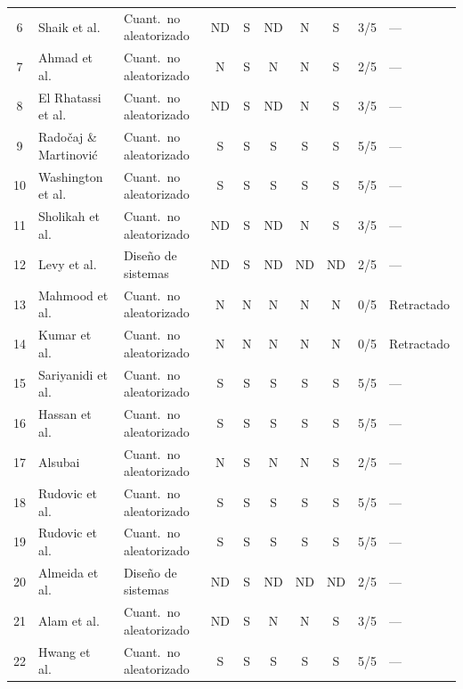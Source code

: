 \documentclass[3p,twocolumn,times]{elsarticle}
\begin{document}
\begin{longtable}{clp{3cm}ccccccl}
		6  & Shaik et al.\ \cite{Shaik2025}               & Cuant.\ no aleatorizado & ND & S  & ND & N  & S  & 3/5 & --- \\
		7  & Ahmad et al.\ \cite{Ahmad2024}               & Cuant.\ no aleatorizado & N  & S  & N  & N  & S  & 2/5 & --- \\
		8  & El Rhatassi et al.\ \cite{Rhatassi2024}      & Cuant.\ no aleatorizado & ND & S  & ND & N  & S  & 3/5 & --- \\
		9  & Radočaj \& Martinović \cite{Radocaj2025}     & Cuant.\ no aleatorizado & S  & S  & S  & S  & S  & 5/5 & --- \\
		10 & Washington et al.\ \cite{Washington2022}     & Cuant.\ no aleatorizado & S  & S  & S  & S  & S  & 5/5 & --- \\
		11 & Sholikah et al.\ \cite{Sholikah2024}         & Cuant.\ no aleatorizado & ND & S  & ND & N  & S  & 3/5 & --- \\
		12 & Levy et al.\ \cite{Levy2024}                 & Diseño de sistemas      & ND & S  & ND & ND & ND & 2/5 & --- \\
		13 & Mahmood et al.\ \cite{Mahmood2025}           & Cuant.\ no aleatorizado & N  & N  & N  & N  & N  & 0/5 & Retractado \\
		14 & Kumar et al.\ \cite{Kumar2024}               & Cuant.\ no aleatorizado & N  & N  & N  & N  & N  & 0/5 & Retractado \\
		15 & Sariyanidi et al.\ \cite{Sariyanidi2025}     & Cuant.\ no aleatorizado & S  & S  & S  & S  & S  & 5/5 & --- \\
		16 & Hassan et al.\ \cite{Hassan2025}             & Cuant.\ no aleatorizado & S  & S  & S  & S  & S  & 5/5 & --- \\
		17 & Alsubai \cite{Alsubai2025}                   & Cuant.\ no aleatorizado & N  & S  & N  & N  & S  & 2/5 & --- \\
		18 & Rudovic et al.\ \cite{Rudovic2018}           & Cuant.\ no aleatorizado & S  & S  & S  & S  & S  & 5/5 & --- \\
		19 & Rudovic et al.\ \cite{Rudovic2019}           & Cuant.\ no aleatorizado & S  & S  & S  & S  & S  & 5/5 & --- \\
		20 & Almeida et al.\ \cite{Almeida2019}           & Diseño de sistemas      & ND & S  & ND & ND & ND & 2/5 & --- \\
		21 & Alam et al.\ \cite{Alam2025}                 & Cuant.\ no aleatorizado & ND & S  & N  & N  & S  & 3/5 & --- \\
		22 & Hwang et al.\ \cite{Hwang2024}               & Cuant.\ no aleatorizado & S  & S  & S  & S  & S  & 5/5 & --- \\

\end{longtable}
\end{document}
